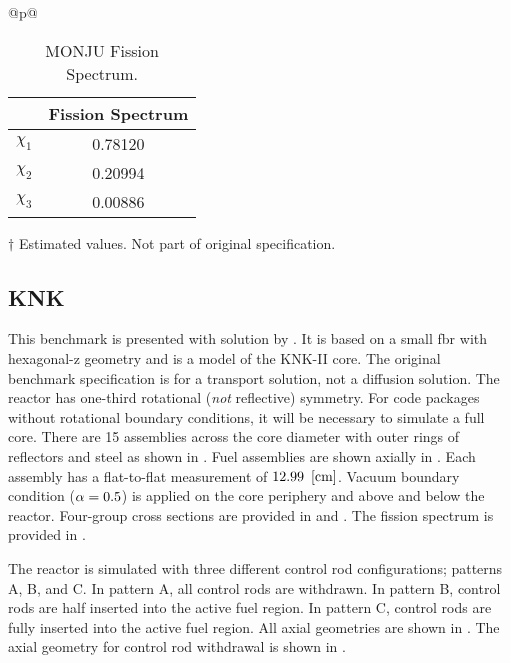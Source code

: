     \begin{table}
      \begin{threeparttable}
        \caption{MONJU Fission Spectrum.}
        \label{tab:monjuchi}
        \begin{tabular}{@{}p{\textwidth}@{}}
          \centering
          \begin{tabular}{cc}
            \toprule
            &Fission Spectrum\tnote{$\dagger$} \\
            \midrule
            $\chi_1$& 0.78120 \\
            $\chi_2$& 0.20994 \\
            $\chi_3$& 0.00886 \\
            \bottomrule
          \end{tabular}
        \end{tabular}
        \begin{tablenotes}
          \centering
          \item[$\dagger$] Estimated values. Not part of original 
            specification.
        \end{tablenotes}
      \end{threeparttable}
    \end{table}

  \subsection{KNK}
    \label{sec:knk}
    This benchmark is presented with solution by \textcite{takedaBenchmark}.  It
    is based on a small \gls{fbr} with hexagonal-z geometry and is a model of
    the KNK-II core. The original benchmark specification is for a transport
    solution, not a diffusion solution. The reactor has one-third rotational
    (\textit{not} reflective) symmetry. For code packages without rotational
    boundary conditions, it will be necessary to simulate a full core. There are
    15 assemblies across the core diameter with outer rings of reflectors and
    steel as shown in . Fuel assemblies are shown axially in
    . Each assembly has a flat-to-flat measurement
    of ${12.99~\left[\text{{cm}}\right]}$. Vacuum boundary condition ($\alpha = 0.5$) is
    applied on the core periphery and above and below the reactor. Four-group
    cross sections are provided in  and .
    The fission spectrum is provided in .

    The reactor is simulated with three different control rod configurations;
    patterns A, B, and C. In pattern A, all control rods are withdrawn. In
    pattern B, control rods are half inserted into the active fuel region. In
    pattern C, control rods are fully inserted into the active fuel region. All
    axial geometries are shown in . The axial geometry
    for control rod withdrawal is shown in .

